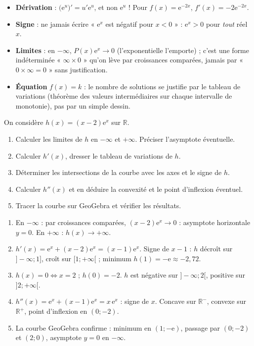\documentclass[11pt]{article}
\begin{document}
\begin{attention}
\begin{itemize}
\item \textbf{Dérivation} : $\bigl(\mathrm{e}^{u}\bigr)'=u'\mathrm{e}^{u}$, et non $\mathrm{e}^{u}$ ! Pour $f(x)=\mathrm{e}^{-2x}$, $f'(x)=-2\mathrm{e}^{-2x}$.
\item \textbf{Signe} : ne jamais écrire « $\mathrm{e}^{x}$ est négatif pour $x<0$ » : $\mathrm{e}^{x}>0$ pour \emph{tout} réel $x$.
\item \textbf{Limites} : en $-\infty$, $P(x)\mathrm{e}^{x}\to 0$ (l'exponentielle l'emporte) ; c'est une forme indéterminée « $\infty\times 0$ » qu'on lève par croissances comparées, jamais par « $0\times\infty=0$ » sans justification.
\item \textbf{Équation} $f(x)=k$ : le nombre de solutions se justifie par le tableau de variations (théorème des valeurs intermédiaires sur chaque intervalle de monotonie), pas par un simple dessin.
\end{itemize}
\end{attention}

\begin{exercice}
On considère $h(x)=(x-2)\mathrm{e}^{x}$ sur $\mathbb{R}$.
\begin{enumerate}
\item Calculer les limites de $h$ en $-\infty$ et $+\infty$. Préciser l'asymptote éventuelle.
\item Calculer $h'(x)$, dresser le tableau de variations de $h$.
\item Déterminer les intersections de la courbe avec les axes et le signe de $h$.
\item Calculer $h''(x)$ et en déduire la convexité et le point d'inflexion éventuel.
\item Tracer la courbe sur GeoGebra et vérifier les résultats.
\end{enumerate}
\end{exercice}

\begin{corrige}[Exercice 5.6]
\begin{enumerate}
\item En $-\infty$ : par croissances comparées, $(x-2)\mathrm{e}^{x}\to 0$ : asymptote horizontale $y=0$. En $+\infty$ : $h(x)\to+\infty$.
\item $h'(x)=\mathrm{e}^{x}+(x-2)\mathrm{e}^{x}=(x-1)\mathrm{e}^{x}$. Signe de $x-1$ : $h$ décroît sur $]-\infty;1]$, croît sur $[1;+\infty[$ ; minimum $h(1)=-\mathrm{e}\approx -2{,}72$.
\item $h(x)=0\iff x=2$ ; $h(0)=-2$. $h$ est négative sur $]-\infty;2[$, positive sur $]2;+\infty[$.
\item $h''(x)=\mathrm{e}^{x}+(x-1)\mathrm{e}^{x}=x\,\mathrm{e}^{x}$ : signe de $x$. Concave sur $\mathbb{R}^{-}$, convexe sur $\mathbb{R}^{+}$, point d'inflexion en $(0;-2)$.
\item La courbe GeoGebra confirme : minimum en $(1;-\mathrm{e})$, passage par $(0;-2)$ et $(2;0)$, asymptote $y=0$ en $-\infty$.
\end{enumerate}
\end{corrige}
\end{document}
